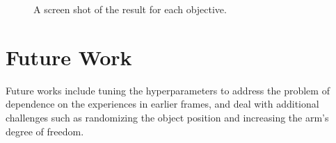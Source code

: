 \documentclass[a4paper]{article}
\begin{document}
\begin{figure}[htp]
  \centering
  \vfill
  \caption{A screen shot of the result for each objective.}
  \label{fig:result}
\end{figure}

\clearpage
\section{Future Work}
Future works include tuning the hyperparameters to address the problem of dependence on the experiences in earlier frames, and deal with additional challenges such as randomizing the object position and increasing the arm's degree of freedom.



\end{document}
